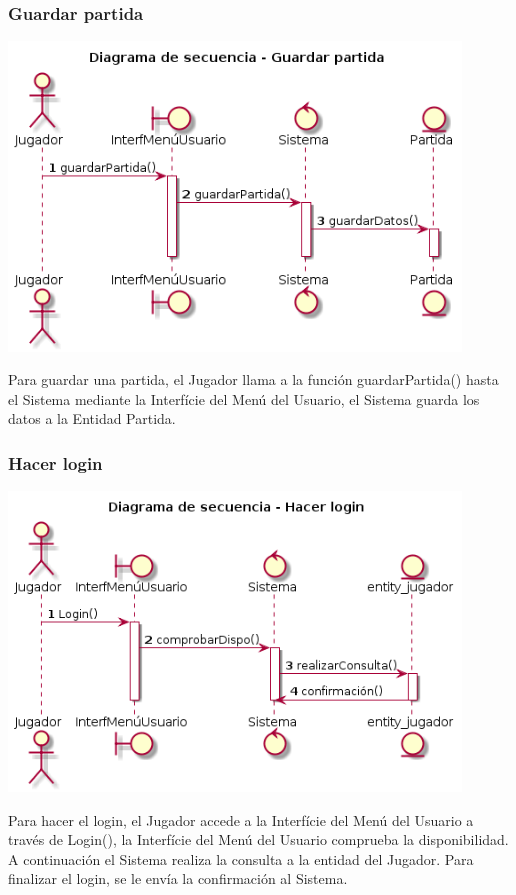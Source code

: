 \subsubsection{Guardar partida}
\begin{center}
  \includegraphics[width=0.9\textwidth]{./imatges/jugador/Guardar_partida.png}
  \end{center}
  Para guardar una partida, el Jugador llama a la función guardarPartida() hasta el Sistema mediante la Interfície del Menú del Usuario, el Sistema guarda los datos a la Entidad Partida.

\subsubsection{Hacer login}
\begin{center}
  \includegraphics[width=0.9\textwidth]{./imatges/jugador/Hacer_login.png}
  \end{center}
  Para hacer el login, el Jugador accede a la Interfície del Menú del Usuario a través de Login(), la Interfície del Menú del Usuario comprueba la disponibilidad. A continuación el Sistema realiza la consulta a la entidad del Jugador. Para finalizar el login, se le envía la confirmación al Sistema.

